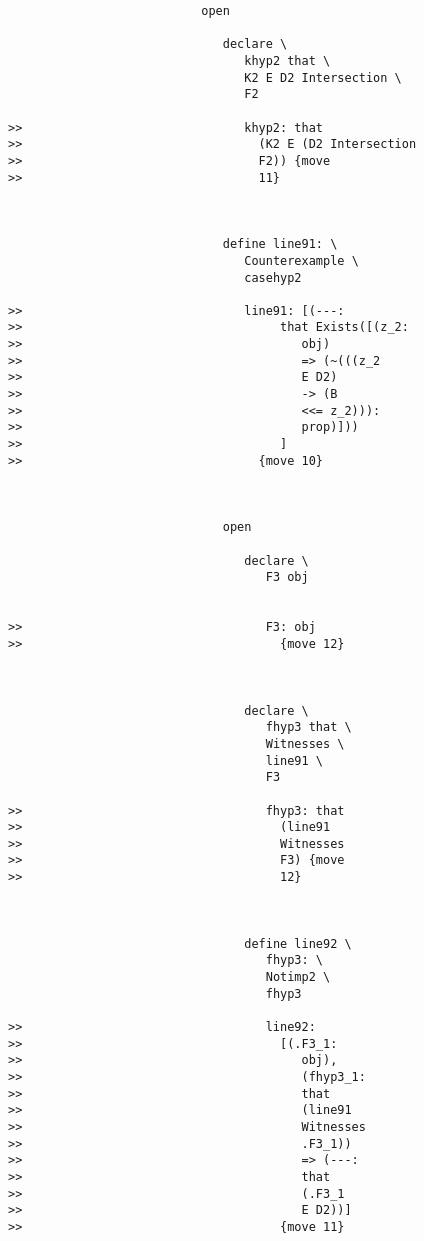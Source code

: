 \documentclass[12pt]{article}
\begin{document}
\begin{verbatim}
                           open

                              declare \
                                 khyp2 that \
                                 K2 E D2 Intersection \
                                 F2

>>                               khyp2: that
>>                                 (K2 E (D2 Intersection
>>                                 F2)) {move
>>                                 11}



                              define line91: \
                                 Counterexample \
                                 casehyp2

>>                               line91: [(---:
>>                                    that Exists([(z_2:
>>                                       obj)
>>                                       => (~(((z_2
>>                                       E D2)
>>                                       -> (B
>>                                       <<= z_2))):
>>                                       prop)]))
>>                                    ]
>>                                 {move 10}



                              open

                                 declare \
                                    F3 obj


>>                                  F3: obj
>>                                    {move 12}



                                 declare \
                                    fhyp3 that \
                                    Witnesses \
                                    line91 \
                                    F3

>>                                  fhyp3: that
>>                                    (line91
>>                                    Witnesses
>>                                    F3) {move
>>                                    12}



                                 define line92 \
                                    fhyp3: \
                                    Notimp2 \
                                    fhyp3

>>                                  line92:
>>                                    [(.F3_1:
>>                                       obj),
>>                                       (fhyp3_1:
>>                                       that
>>                                       (line91
>>                                       Witnesses
>>                                       .F3_1))
>>                                       => (---:
>>                                       that
>>                                       (.F3_1
>>                                       E D2))]
>>                                    {move 11}




\end{verbatim}
\end{document}
